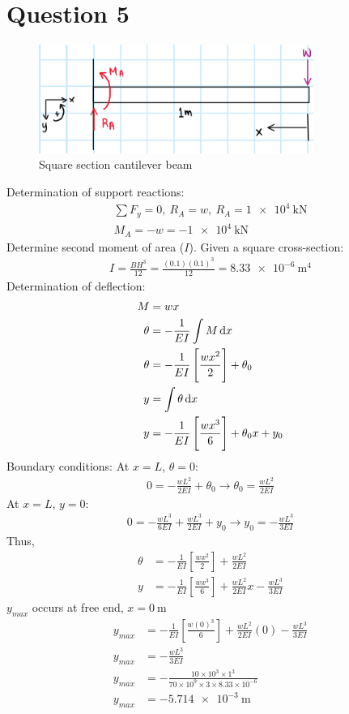 \documentclass[11pt]{article}
\numberwithin{equation}{section}
\begin{document}
\section{Question 5}
\begin{figure}[H]
  \centering
  \includegraphics[width = 0.8\textwidth]{./img/Q3Analysis.png}
  \caption{Square section cantilever beam}
\end{figure}
Determination of support reactions:
\begin{align}
  \sum F_y = 0, \ R_A = w, \ R_A = \SI{1e4}{\kilo\newton}\\
  M_A = -w = \SI{-1e4}{\kilo\newton}
\end{align}
Determine second moment of area ($I$). Given a square cross-section:
\begin{align}
  I = \frac{BH^3}{12} = \frac{(0.1)(0.1)^3}{12} = \SI{8.33e-6}{\metre\tothe{4}}
\end{align}
Determination of deflection:
\begin{align}
  M &= wx\\
  \theta &= -\frac{1}{EI} \int M \dif x\\
  \theta &= -\frac{1}{EI} \left[ \frac{wx^2}{2} \right] + \theta_0\\
  y &= \int \theta \dif x\\
  y &= -\frac{1}{EI} \left[ \frac{wx^3}{6} \right] + \theta_0 x + y_0
\end{align}
Boundary conditions:
At $x = L$, $\theta = 0$:
\begin{align}
  0 = -\frac{wL^2}{2EI} + \theta_0 \rightarrow \theta_0 = \frac{wL^2}{2EI}
\end{align}
At $x = L$, $y = 0$:
\begin{align}
  0 = -\frac{wL^3}{6EI} + \frac{wL^3}{2EI} + y_0 \rightarrow y_0 = -\frac{wL^3}{3EI}
\end{align}
Thus,
\begin{align}
  \theta &= -\frac{1}{EI} \left[ \frac{wx^2}{2} \right] + \frac{wL^2}{2EI}\\
  y &= -\frac{1}{EI} \left[ \frac{wx^3}{6} \right] + \frac{wL^2}{2EI}x - \frac{wL^3}{3EI}
\end{align}
$y_{max}$ occurs at free end, $x = \SI{0}{\metre}$
\begin{align}
  y_{max} &= -\frac{1}{EI} \left[ \frac{w (0)^3}{6} \right] + \frac{wL^2}{2EI} (0) - \frac{wL^3}{3EI}\\
  y_{max} &= -\frac{wL^3}{3EI}\\
  y_{max} &= -\frac{10\times 10^{3} \times 1^3}{70 \times 10^9 \times 3 \times 8.33 \times 10^{-6}}\\
  y_{max} &= \SI{-5.714e-3}{\metre}
\end{align}
\end{document}

